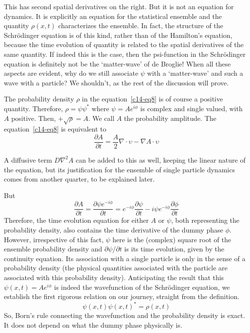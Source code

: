 This has second spatial derivatives on the right. But it is not an equation for dynamics. It
is explicitly an equation for the statistical ensemble and the quantity $\rho (x, t)$ characterizes
the ensemble. In fact, the structure of the Schr\"{o}dinger equation is of this kind, rather than
of the Hamilton's equation, because the time evolution of quantity is related to the spatial
derivatives of the same quantity. If indeed this is the case, then the psi-function in the
Schr\"{o}dinger equation is definitely not be the `matter-wave' of de Broglie! When all these
aspects are evident, why do we still associate $\psi$ with a `matter-wave' and such a wave with a
particle? We shouldn't, as the rest of the discussion will prove.

The probability density $\rho$ in the equation~\ref{c14-eq8} is of course a positive quantity. Therefore,
$\rho = \psi \psi^{\ast}$ where $\psi = Ae^{i\phi}$ is complex and single valued, with $A$ positive. Then, $+\sqrt{\rho} = A$.
We call $A$ the probability amplitude. The equation~\ref{c14-eq8} is equivalent to
\begin{equation*}
\frac{\partial A}{\partial t} = \frac{A}{2} \nabla \cdot \upsilon - \nabla A \cdot \upsilon \tag{11}\label{c14-eq11}
\end{equation*}

A diffusive term $D \nabla^2 A$ can be added to this as well, keeping the linear nature of the equation,
but its justification for the ensemble of single particle dynamics comes from another quarter,
to be explained later.

But
\begin{equation*}
\frac{\partial A}{\partial t} = \frac{\partial \psi e^{-i \phi}}{\partial t} = e^{-i \phi} \frac{\partial \psi}{\partial t} -  i \psi e^{-i \phi} \frac{\partial \phi}{\partial t}  \tag{12}\label{c14-eq12}
\end{equation*}
Therefore, the time evolution equation for either $A$ or $\psi$, both representing the probability
density, also contains the time derivative of the dummy phase $\phi$. However, irrespective
of this fact, $\psi$ here is the (complex) square root of the ensemble probability density and
$\partial \psi /\partial t$ is its time evolution, given by the continuity equation. Its association with a single
particle is only in the sense of a probability density (the physical quantities associated with
the particle are associated with this probability density). Anticipating the result that this
$\psi (x, t) = Ae^{i \phi}$ is indeed the wavefunction of the Schr\"{o}dinger equation, we establish the first
rigorous relation on our journey, straight from the definition.
\begin{equation*}
\psi (x, t) \psi (x, t)^{\ast} = \rho(x, t) \tag{13}\label{c14-eq13}
\end{equation*}
So, Born's rule connecting the wavefunction and the probability density is exact. It does
not depend on what the dummy phase physically is.

